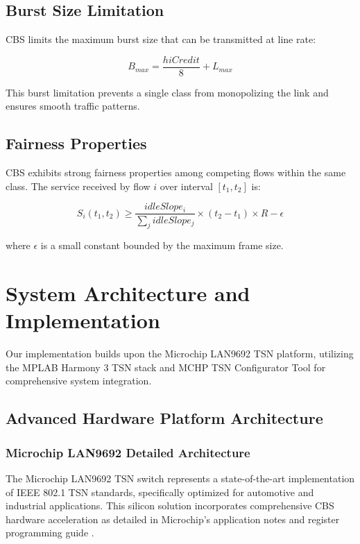 \documentclass[10pt, journal, compsoc]{IEEEtran}
\begin{document}
\subsection{Burst Size Limitation}

CBS limits the maximum burst size that can be transmitted at line rate:

\begin{equation}
B_{max} = \frac{hiCredit}{8} + L_{max}
\end{equation}

This burst limitation prevents a single class from monopolizing the link and ensures smooth traffic patterns.

\subsection{Fairness Properties}

CBS exhibits strong fairness properties among competing flows within the same class. The service received by flow $i$ over interval $[t_1, t_2]$ is:

\begin{equation}
S_i(t_1, t_2) \geq \frac{idleSlope_i}{\sum_j idleSlope_j} \times (t_2 - t_1) \times R - \epsilon
\end{equation}

where $\epsilon$ is a small constant bounded by the maximum frame size.

\section{System Architecture and Implementation}
\label{sec:system_architecture}

Our implementation builds upon the Microchip LAN9692 TSN platform, utilizing the MPLAB Harmony 3 TSN stack \cite{microchip2024harmony} and MCHP TSN Configurator Tool \cite{microchip2023configurator} for comprehensive system integration.

\subsection{Advanced Hardware Platform Architecture}

\subsubsection{Microchip LAN9692 Detailed Architecture}

The Microchip LAN9692 TSN switch \cite{microchip2024lan9692} represents a state-of-the-art implementation of IEEE 802.1 TSN standards, specifically optimized for automotive and industrial applications. This silicon solution incorporates comprehensive CBS hardware acceleration as detailed in Microchip's application notes \cite{microchip2024cbs_app} and register programming guide \cite{microchip2023register}.
\end{document}
